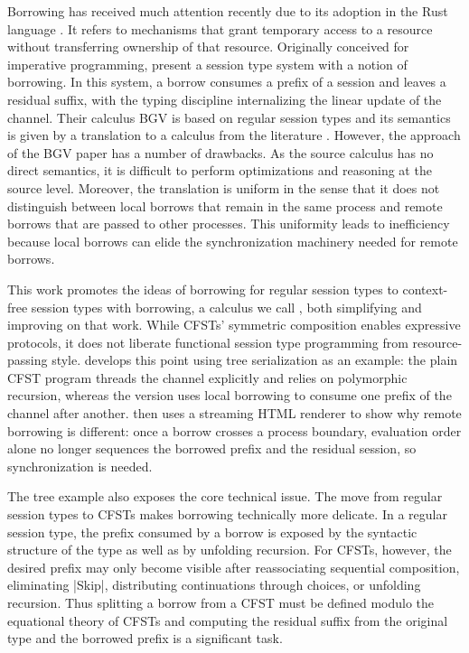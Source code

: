 Borrowing has received much attention recently due to its adoption in
the Rust language \cite{team24:_rust_progr_languag}. It refers to mechanisms that
grant temporary access to a resource without transferring ownership of
that resource. Originally conceived for imperative programming,
\citet{DBLP:journals/pacmpl/SaffrichS0V25} present a session type
system with a notion of borrowing.
In this system, a borrow consumes a prefix of a session and leaves a residual suffix, with the
typing discipline internalizing the linear update of the channel.
Their calculus BGV is based on regular
session types \cite{DBLP:conf/esop/LindleyM15} and its semantics is
given by a translation to a calculus from the literature
\cite{DBLP:journals/lmcs/KokkeD23}. However, the approach of the BGV paper has a number of
drawbacks. As the source calculus has no direct semantics, it is
difficult to perform optimizations and reasoning at the source level. Moreover, the
translation is uniform in the sense that it does not distinguish
between local borrows that remain in the same process and remote
borrows that are passed to other processes. This uniformity leads to
inefficiency because local borrows can elide the synchronization
machinery needed for remote borrows. 

This work promotes the ideas of borrowing for regular session types
\cite{DBLP:journals/pacmpl/SaffrichS0V25} to context-free session
types with borrowing, a calculus we call \thecalculus, both
simplifying and improving on that work. While CFSTs'
symmetric composition enables expressive protocols, it does not
liberate functional session type programming from resource-passing
style.  develops this point using tree
serialization as an example: the plain CFST program
threads the channel explicitly and relies on polymorphic recursion,
whereas the \thecalculus version uses local borrowing to consume one
prefix of the channel after another.  then
uses a streaming HTML renderer to show why remote borrowing is
different: once a borrow crosses a process boundary, evaluation order
alone no longer sequences the borrowed prefix and the residual
session, so synchronization is needed.

The tree example also exposes the core technical issue. The move from regular 
session types to CFSTs makes borrowing technically more delicate. In a
regular session type, the prefix consumed by a borrow is exposed by
the syntactic structure of the type as well as by unfolding
recursion. For CFSTs, however, the desired 
prefix may only become visible after reassociating sequential
composition, eliminating |Skip|, distributing continuations
through choices, or unfolding recursion.  Thus splitting a borrow from
a CFST must be defined modulo the equational theory of CFSTs and
computing the residual suffix from the original type and the borrowed
prefix is a significant task.

